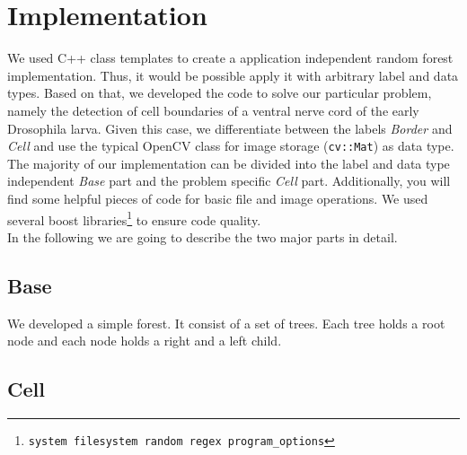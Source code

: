 \section{Implementation}
\label{sec:implementation}

We used C++ class templates to create a application independent random forest implementation. Thus, it would be possible apply it with arbitrary label and data types. Based on that, we developed the code to solve our particular problem, namely the detection of cell boundaries of a ventral nerve cord of the early Drosophila larva. Given this case, we differentiate between the labels \emph{Border} and \emph{Cell} and use the typical OpenCV class for image storage (\texttt{cv::Mat}) as data type.\\
The majority of our implementation can be divided into the label and data type independent \emph{Base} part and the problem specific \emph{Cell} part. Additionally, you will find some helpful pieces of code for basic file and image operations. We used several boost libraries\footnote{\texttt{system filesystem random regex program\_options}} to ensure code quality.\\
In the following we are going to describe the two major parts in detail.

\subsection{Base}
\label{subsec:base}
We developed a simple forest. It consist of a set of trees. Each tree holds a root node and each node holds a right and a left child. 


\subsection{Cell}
\label{subsec:base}